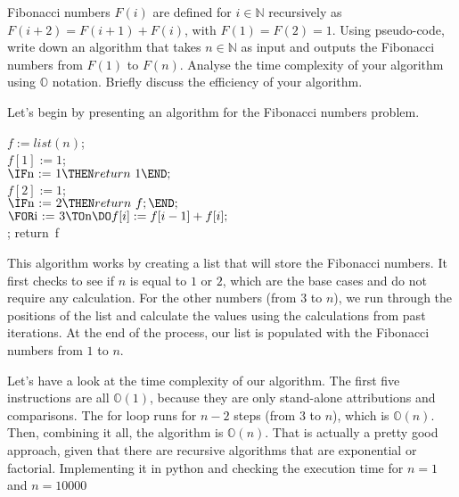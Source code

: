 \documentclass[11pt]{article}
\newenvironment{EX}[2][Exercise]{\begin{trivlist}
\item[{\color{red} \hskip \labelsep {\bfseries #1}\hskip \labelsep {\bfseries #2.}}]}{\end{trivlist}}
\newenvironment{SL}[1][Solution]{\begin{trivlist}
\item[{\color{blue} \hskip \labelsep {\bfseries #1:}}]}{\end{trivlist}}
\begin{document}

\begin{EX}{R.3}
 Fibonacci numbers $F(i)$ are defined for $i \in \mathbb{N}$ recursively as $F(i+2) = F(i+1) + F(i)$, with $F(1) = F(2) = 1$. Using pseudo-code, write down an algorithm that takes $n \in \mathbb{N}$ as input and outputs the Fibonacci numbers from $F(1)$ to $F(n)$. Analyse the time complexity of your algorithm using $\mathbb{O}$ notation. Briefly discuss the efficiency of your algorithm.
\end{EX}

\begin{SL}
 Let's begin by presenting an algorithm for the Fibonacci numbers problem.
 
 \begin{center}
  \begin{program}
   $f := list(n)$; \\
   $f[1] := 1$; \\
   \(\IF $n := 1$ \THEN return\ 1 \END;\) \\ 
   $f[2] := 1$; \\
   \(\IF $n := 2$ \THEN return\ f;  \END;\) \\
   \(\FOR $i := 3$ \TO $n$ \DO \\ f[i] := f[i-1] + f[i]; \\ \)\\
   \END;
   return\ f
  \end{program}
 \end{center}
\end{SL}

This algorithm works by creating a list that will store the Fibonacci numbers. It first checks to see if $n$ is equal to $1$ or $2$, which are the base cases and do not require any calculation. For the other numbers (from $3$ to $n$), we run through the positions of the list and calculate the values using the calculations from past iterations. At the end of the process, our list is populated with the Fibonacci numbers from $1$ to $n$.

Let's have a look at the time complexity of our algorithm. The first five instructions are all $\mathbb{O}(1)$, because they are only stand-alone attributions and comparisons. The for loop runs for $n-2$ steps (from $3$ to $n$), which is $\mathbb{O}(n)$. Then, combining it all, the algorithm is $\mathbb{O}(n)$. That is actually a pretty good approach, given that there are recursive algorithms that are exponential or factorial. Implementing it in python and checking the execution time for $n=1$  and $n=10000$
\end{document}
